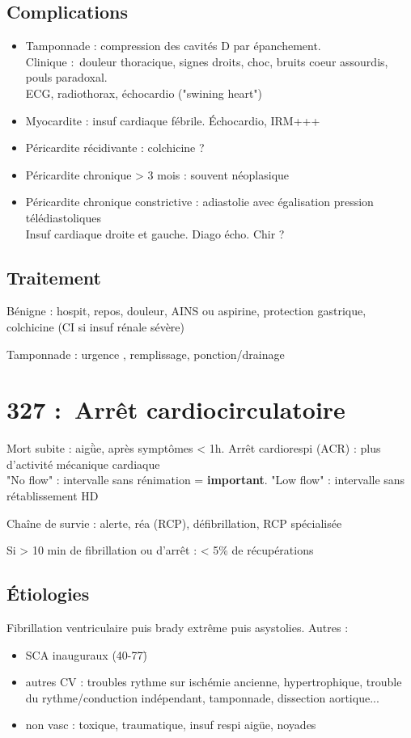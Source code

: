 \subsection{Complications}
\begin{itemize}
  \item Tamponnade : compression des cavités D par épanchement.\\
    Clinique : douleur thoracique, signes droits, choc, bruits coeur assourdis,
    pouls paradoxal. \\
    ECG, radiothorax, échocardio ("swining heart")
  \item Myocardite : insuf cardiaque fébrile. Échocardio, IRM+++
  \item Péricardite récidivante : colchicine ?
  \item Péricardite chronique > 3 mois : souvent néoplasique
  \item Péricardite chronique constrictive : adiastolie avec égalisation
    pression télédiastoliques\\
    Insuf cardiaque droite et gauche. Diago écho. Chir ?
\end{itemize}

\subsection{Traitement}
Bénigne : hospit, repos, douleur, AINS ou aspirine, protection gastrique,
colchicine (CI si insuf rénale sévère)

Tamponnade : urgence \skull, remplissage, ponction/drainage

\section{327 : Arrêt cardiocirculatoire}%
\label{sec:327_arret_cardiocirculatoire}

Mort subite : aigǜe, après symptômes < 1h. Arrêt cardiorespi (ACR) : plus d'activité
mécanique cardiaque\\
"No flow" : intervalle sans rénimation = \textbf{important}. 
"Low flow" : intervalle sans rétablissement HD

Chaîne de survie : alerte, réa (RCP), défibrillation, RCP spécialisée

Si > 10 min de fibrillation ou d'arrêt : < 5\% de récupérations

\subsection{Étiologies}
Fibrillation ventriculaire puis brady extrême puis asystolies.
Autres :
\begin{itemize}
  \item SCA inauguraux (40-77\=)
  \item autres CV : troubles rythme sur ischémie ancienne, hypertrophique,
    trouble du rythme/conduction indépendant, tamponnade, dissection aortique...
  \item non vasc : toxique, traumatique, insuf respi aigüe, noyades
\end{itemize}

